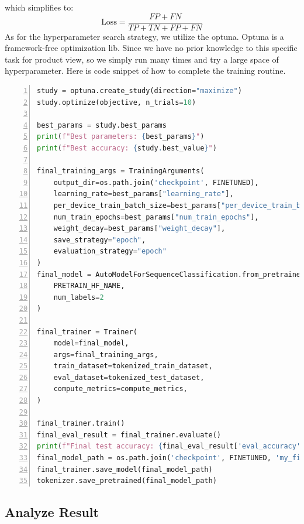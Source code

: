 \documentclass{article}
\begin{document}
which simplifies to:
\[
\text{Loss} = \frac{FP + FN}{TP + TN + FP + FN}
\]
\hypertarget{hpd}{{}}As for the hyperparameter search strategy, we utilize the optuna. Optuna is a framework-free optimization lib. Since we have no prior knowledge to this specific task for product view, so we simply run many times and try a large space of hyperparameter. Here is code snippet of how to complete the training routine.

\begin{lstlisting}[language=Python, numbers=left]
study = optuna.create_study(direction="maximize")
study.optimize(objective, n_trials=10)

best_params = study.best_params
print(f"Best parameters: {best_params}")
print(f"Best accuracy: {study.best_value}")

final_training_args = TrainingArguments(
    output_dir=os.path.join('checkpoint', FINETUNED),
    learning_rate=best_params["learning_rate"],
    per_device_train_batch_size=best_params["per_device_train_batch_size"],
    num_train_epochs=best_params["num_train_epochs"],
    weight_decay=best_params["weight_decay"],
    save_strategy="epoch",
    evaluation_strategy="epoch"
)
final_model = AutoModelForSequenceClassification.from_pretrained(
    PRETRAIN_HF_NAME, 
    num_labels=2
)

final_trainer = Trainer(
    model=final_model,
    args=final_training_args,
    train_dataset=tokenized_train_dataset,
    eval_dataset=tokenized_test_dataset,
    compute_metrics=compute_metrics,
)

final_trainer.train()
final_eval_result = final_trainer.evaluate()
print(f"Final test accuracy: {final_eval_result['eval_accuracy']}")
final_model_path = os.path.join('checkpoint', FINETUNED, 'my_final_model')
final_trainer.save_model(final_model_path)
tokenizer.save_pretrained(final_model_path)

\end{lstlisting}

\subsection{Analyze Result}
\end{document}
